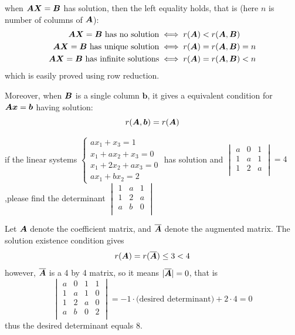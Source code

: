 \documentclass{overview}
\begin{document}
when $\boldsymbol{A}\boldsymbol{X}=\boldsymbol{B}$ has solution, then the left equality holds,
that is (here $n$ is number of columns of $\boldsymbol{A}$):
\[
\begin{aligned}
	\boldsymbol{A}\boldsymbol{X}=\boldsymbol{B} \text{ has no solution} &\iff r(\boldsymbol{A})< r(\boldsymbol{A} , \boldsymbol{B}) \\
	\boldsymbol{A}\boldsymbol{X}=\boldsymbol{B} \text{ has unique solution} &\iff r(\boldsymbol{A})= r(\boldsymbol{A} , \boldsymbol{B})=n \\
	\boldsymbol{A}\boldsymbol{X}=\boldsymbol{B} \text{ has infinite solutions} &\iff r(\boldsymbol{A})= r(\boldsymbol{A} , \boldsymbol{B})<n \\
\end{aligned}
\] 
which is easily proved using row reduction.

Moreover, when $\boldsymbol{B}$ is a single column $\boldsymbol{b}$, it gives a equivalent
condition for  $\boldsymbol{A}\boldsymbol{x}=\boldsymbol{b}$ having solution:
\begin{equation}
	r(\boldsymbol{A} , \boldsymbol{b}) = r(\boldsymbol{A})
\end{equation}

\begin{example}
if the linear systems 
$ \begin{cases}
	ax_1+x_3=1\\
	x_1+ax_2+x_3=0\\
	x_1+2x_2+ax_3=0\\
	ax_1+bx_2=2
\end{cases} $
has solution and $ \begin{vmatrix}
	a & 0 & 1 \\
	1 & a & 1 \\
	1 & 2 & a \\
\end{vmatrix} =4 $,please find the determinant
$
\begin{vmatrix}
	1 & a & 1 \\
	1 & 2 & a \\
	a & b & 0 \\
\end{vmatrix}
$
\begin{answer}
Let $\boldsymbol{A}$ denote the coefficient matrix, and $\overline{\boldsymbol{A}}$
denote the augmented matrix. The solution existence condition gives
\[
	r(\boldsymbol{A}) = r(\overline{\boldsymbol{A}}) \leq 3 < 4
\]
however, $\overline{\boldsymbol{A}}$ is a 4 by 4 matrix, so it means $|\overline{\boldsymbol{A}}|=0$, that is
\[
	\begin{vmatrix}
		a & 0 & 1 & 1 \\
		1 & a & 1 & 0 \\
		1 & 2 & a & 0 \\
		a & b & 0 & 2 \\
	\end{vmatrix} = 
	-1\cdot \text{(desired determinant)} + 2\cdot 4 = 0
\] 
thus the desired determinant equals 8.
\end{answer}
\end{example}
\end{document}
